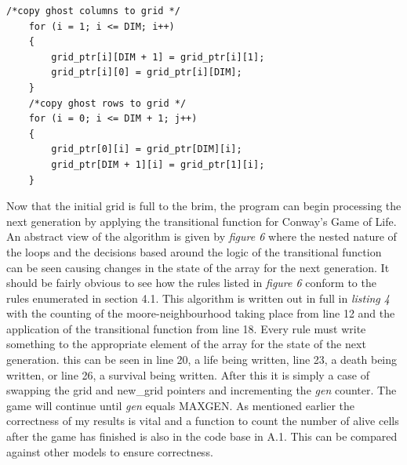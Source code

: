 \documentclass[11pt]{article} %
\begin{document}
\pagebreak
\begin{lstlisting}[caption = {Copying ghost cells}]
    /*copy ghost columns to grid */
    for (i = 1; i <= DIM; i++)
    {
        grid_ptr[i][DIM + 1] = grid_ptr[i][1];
        grid_ptr[i][0] = grid_ptr[i][DIM];
    }
    /*copy ghost rows to grid */
    for (i = 0; i <= DIM + 1; j++)
    {
        grid_ptr[0][i] = grid_ptr[DIM][i];
        grid_ptr[DIM + 1][i] = grid_ptr[1][i];
    }
\end{lstlisting}
Now that the initial grid is full to the brim, the program can begin processing the next generation by applying the transitional function for Conway's Game of Life. An abstract view of the algorithm is given by {\it figure 6} where the nested nature of the loops and the decisions based around the logic of the transitional function can be seen causing changes in the state of the array for the next generation. It should be fairly obvious to see how the rules listed in {\it figure 6} conform to the rules enumerated in section 4.1. This algorithm is written out in full in {\it listing 4} with the counting of the moore-neighbourhood taking place from line 12 and the application of the transitional function from line 18. Every rule must write something to the appropriate element of the array for the state of the next generation. this can be seen in line 20, a life being written, line 23, a death being written, or line 26, a survival being written. After this it is simply a case of swapping the grid and new\_grid pointers and incrementing the {\it gen} counter. The game will continue until {\it gen} equals MAXGEN. As mentioned earlier the correctness of my results is vital and a function to count the number of alive cells after the game has finished is also in the code base in A.1. This can be compared against other models to ensure correctness. 
\end{document}
